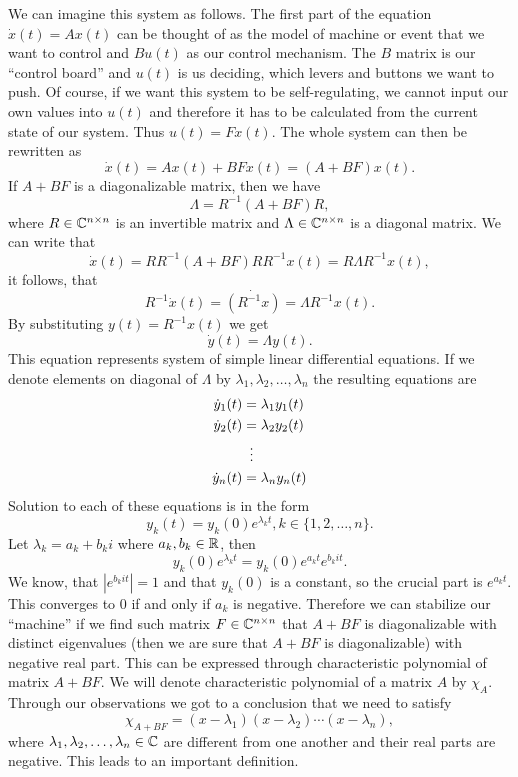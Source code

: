 We can imagine this system as follows. The first part of the equation $\dot{x}(t)=Ax(t)$ can be thought of as the model of machine or event that we want to control and $Bu(t)$ as our control mechanism. The $B$ matrix is our ``control board'' and $u(t)$ is us deciding, which levers and buttons we want to push. Of course, if we want this system to be self-regulating, we cannot input our own values into $u(t)$ and therefore it has to be calculated from the current state of our system. Thus $u(t)=Fx(t)$. The whole system can then be rewritten as $$\dot{x}(t)=Ax(t)+BFx(t)=(A+BF)x(t).$$ If $A+BF$ is a diagonalizable matrix, then we have $$\Lambda=R^{-1}(A+BF)R,$$ where $R \in \mathbb{C} ^{n \times n}$ is an invertible matrix and $\Lambda \in \mathbb{C} ^{n \times n}$ is a diagonal matrix. We can write that $$\dot{x}(t)=RR^{-1}(A+BF)RR^{-1}x(t)=R\Lambda R^{-1}x(t),$$ it follows, that $$R^{-1}\dot{x}(t)=\dot{(R^{-1}x)}=\Lambda R^{-1}x(t).$$ By substituting $y(t)=R^{-1}x(t)$ we get $$\dot{y}(t)=\Lambda y(t).$$ This equation represents system of simple linear differential equations. If we denote elements on diagonal of $\Lambda$ by $\lambda_1,\lambda_2,\ldots,\lambda_n$ the resulting equations are  
\begin{align*}
  \dot{y}_1(t)&=\lambda_1y_1(t) \\
  \dot{y}_2(t)&=\lambda_2y_2(t) \\
  &\vdotswithin{=} \\
  \dot{y}_n(t)&=\lambda_ny_n(t) 
\end{align*}
Solution to each of these equations is in the form 
$$y_k(t)=y_k(0)e^{\lambda_kt}, k\in\{1,2,\ldots,n\}.$$
Let $\lambda_k=a_k+b_ki$ where $a_k,b_k\in \mathbb{R}$, then 
$$y_k(0)e^{\lambda_kt}=y_k(0)e^{a_kt}e^{b_kit}.$$ 
We know, that $|e^{b_kit}|=1$ and that $y_k(0)$ is a constant, so the crucial part is $e^{a_kt}$. This converges to 0 if and only if $a_k$ is negative. Therefore we can stabilize our ``machine'' if we find such matrix $F \in \mathbb{C}^{n \times n}$ that $A+BF$ is diagonalizable with distinct eigenvalues (then we are sure that $A+BF$ is diagonalizable) with negative real part. This can be expressed through characteristic polynomial of matrix $A+BF$. We will denote characteristic polynomial of a matrix $A$ by $\chi_A$. Through our observations we got to a conclusion that we need to satisfy $$\chi_{A+BF}=(x-\lambda_1)(x-\lambda_2)\cdots(x-\lambda_n),$$ where $\lambda_1,\lambda_2,\ldots,\lambda_n \in \mathbb{C}$ are different from one another and their real parts are negative. This leads to an important definition.

